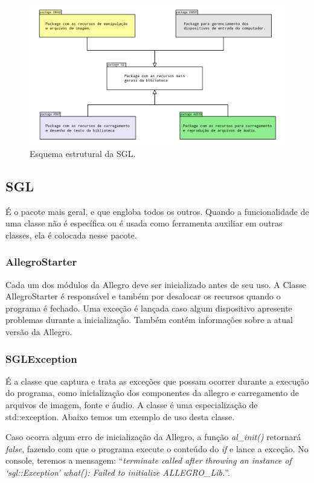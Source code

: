 \begin{figure}[H]
    \centering
    \includegraphics[scale = 0.2]{Imagens/pacotes.png}
    \caption{Esquema estrutural da SGL.}
    \label{pacotes}
\end{figure}
%
%
%
\subsection{SGL}
%
%
É o pacote mais geral, e que engloba todos os outros. Quando a funcionalidade de uma classe não é específica ou é usada como ferramenta auxiliar em outras classes, ela é colocada nesse pacote.
%
\subsubsection{AllegroStarter}
%
Cada um dos módulos da Allegro deve ser inicializado antes de seu uso. A Classe AllegroStarter é responsável e também por desalocar os recursos quando o programa é fechado. Uma exceção é lançada caso algum dispositivo apresente problemas durante a inicialização. Também contém informações sobre a atual versão da Allegro. 
%
%
\subsubsection{SGLException}
%
É a classe que captura e trata as exceções que possam ocorrer durante a execução do programa, como inicialização dos componentes da allegro e carregamento de arquivos de imagem, fonte e áudio. A classe é uma especialização de std::exception. Abaixo temos um exemplo de uso desta classe.
%

%
\par 
Caso ocorra algum erro de inicialização da Allegro, a função \textit{al\_init()} retornará \textit{false}, fazendo com que o programa execute o conteúdo do \textit{if} e lance a exceção. No console, teremos a mensagem:  ``\textit{terminate called after throwing an instance of `sgl::Exception'
what(): Failed to initialize ALLEGRO\_Lib.}''.
%
%
